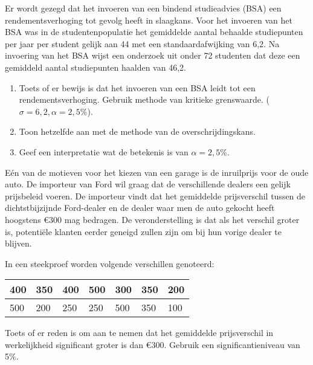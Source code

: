 \begin{exercise}
  \label{oef:bindend-studieadvies}
  
  Er wordt gezegd dat het invoeren van een bindend studieadvies (BSA) een rendementsverhoging tot gevolg heeft in slaagkans. Voor het invoeren van het BSA was in de studentenpopulatie het gemiddelde aantal behaalde studiepunten per jaar per student gelijk aan 44 met een standaardafwijking van 6,2. Na invoering van het BSA wijst een onderzoek uit onder 72 studenten dat deze een gemiddeld aantal studiepunten haalden van 46,2.
  
  \begin{enumerate}
    \item Toets of er bewijs is dat het invoeren van een BSA leidt tot een rendementsverhoging. Gebruik methode van kritieke grenswaarde. ($\sigma = 6,2, \alpha = 2,5\%$).
    \item Toon hetzelfde aan met de methode van de overschrijdingskans.
    \item Geef een interpretatie wat de betekenis is van $\alpha = 2,5 \%$.
  \end{enumerate}
\end{exercise}

\begin{exercise}
  \label{oef:prijsverschil-autos}
  
  Eén van de motieven voor het kiezen van een garage is de inruilprijs voor de oude auto. De importeur van Ford wil graag dat de verschillende dealers een gelijk prijsbeleid voeren. De importeur vindt dat het gemiddelde prijsverschil tussen de dichtstbijzijnde Ford-dealer en de dealer waar men de auto gekocht heeft hoogstens \euro{300} mag bedragen. De veronderstelling is dat als het verschil groter is, potentiële klanten eerder geneigd zullen zijn om bij hun vorige dealer te blijven.
  
  In een steekproef worden volgende verschillen genoteerd:
  
  \begin{center}
    \begin{tabular}{|l|l|l|l|l|l|l|}
      \hline
      400 & 350 & 400 & 500 & 300 & 350 & 200 \\ \hline
      500 & 200 & 250 & 250 & 500 & 350 & 100 \\ \hline
    \end{tabular}
  \end{center}

  Toets of er reden is om aan te nemen dat het gemiddelde prijsverschil in werkelijkheid significant groter is dan \euro{300}. Gebruik een significantieniveau van 5\%. 
  
\end{exercise}

